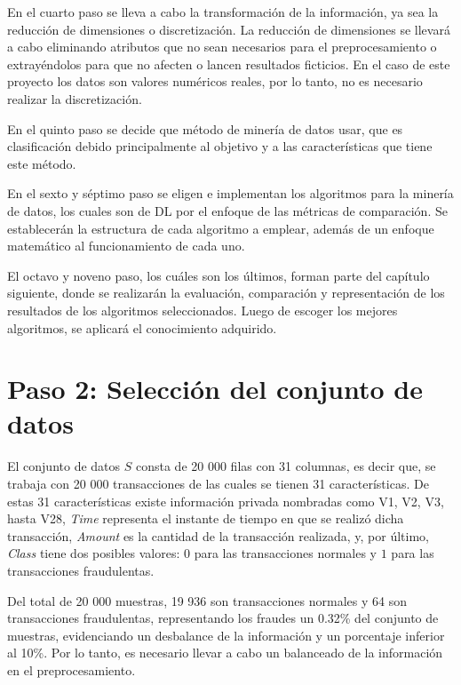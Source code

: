   En el cuarto paso se lleva a cabo la transformaci\'{o}n de la informaci\'{o}n, ya sea la reducci\'{o}n de dimensiones o discretizaci\'{o}n. La reducci\'{o}n de dimensiones se llevar\'{a} a cabo eliminando atributos que no sean necesarios para el preprocesamiento o extray\'{e}ndolos para que no afecten o lancen resultados ficticios. En el caso de este proyecto los datos son valores num\'{e}ricos reales, por lo tanto, no es necesario realizar la discretizaci\'{o}n.
  
  En el quinto paso se decide que m\'{e}todo de miner\'{i}a de datos usar, que es clasificaci\'{o}n debido principalmente al objetivo y a las caracter\'{i}sticas que tiene este m\'{e}todo.

  En el sexto y s\'{e}ptimo paso se eligen e implementan los algoritmos para la miner\'{i}a de datos, los cuales son de DL por el enfoque de las m\'{e}tricas de comparaci\'{o}n. Se establecer\'{a}n la estructura de cada algoritmo a emplear, adem\'{a}s de un enfoque matem\'{a}tico al funcionamiento de cada uno.

  El octavo y noveno paso, los cu\'{a}les son los \'{u}ltimos, forman parte del cap\'{i}tulo siguiente, donde se realizar\'{a}n la evaluaci\'{o}n, comparaci\'{o}n y representaci\'{o}n de los resultados de los algoritmos seleccionados. Luego de escoger los mejores algoritmos, se aplicar\'{a} el conocimiento adquirido.

\section{Paso 2: Selecci\'{o}n del conjunto de datos}

  El conjunto de datos $S$ consta de 20 000 filas con 31 columnas, es decir que, se trabaja con 20 000 transacciones de las cuales se tienen 31 caracter\'{i}sticas. De estas 31 caracter\'{i}sticas existe informaci\'{o}n privada nombradas como V1, V2, V3, hasta V28, \textit{Time} representa el instante de tiempo en que se realiz\'{o} dicha transacci\'{o}n, \textit{Amount} es la cantidad de la transacci\'{o}n realizada, y, por \'{u}ltimo, \textit{Class} tiene dos posibles valores: $0$ para las transacciones normales y $1$ para las transacciones fraudulentas.

  Del total de 20 000 muestras, 19 936 son transacciones normales y 64 son transacciones fraudulentas, representando los fraudes un 0.32\% del conjunto de muestras, evidenciando un desbalance de la informaci\'{o}n y un porcentaje inferior al 10\%. Por lo tanto, es necesario llevar a cabo un balanceado de la informaci\'{o}n en el preprocesamiento.

